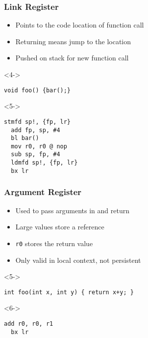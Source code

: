 \documentclass{beamer}
\begin{document}
\begin{frame}[fragile]
\frametitle{Link Register}
\begin{itemize}
\item<1-> Points to the code location of function call
\item<2-> Returning means jump to the location
\item<3-> Pushed on stack for new function call
\end{itemize}

\begin{block}<4->{}
\begin{lstlisting}
void foo() {bar();}
\end{lstlisting}
\end{block}

\begin{block}<5->{}
\begin{lstlisting}[language=ASM]
  stmfd sp!, {fp, lr}
  add fp, sp, #4
  bl bar()
  mov r0, r0 @ nop
  sub sp, fp, #4
  ldmfd sp!, {fp, lr}
  bx lr
\end{lstlisting}
\end{block}

\end{frame}

\begin{frame}[fragile]
\frametitle{Argument Register}
\begin{itemize}
\item<1-> Used to pass arguments in and return
\item<2-> Large values store a reference
\item<3-> \lstinline{r0} stores the return value
\item<4-> Only valid in local context, not persistent

\end{itemize}

\begin{block}<5->{}
\begin{lstlisting}
int foo(int x, int y) { return x+y; }
\end{lstlisting}
\end{block}

\begin{block}<6->{}
\begin{lstlisting}[language=ASM]
  add r0, r0, r1
  bx lr
\end{lstlisting}
\end{block}

\end{frame}
\end{document}

